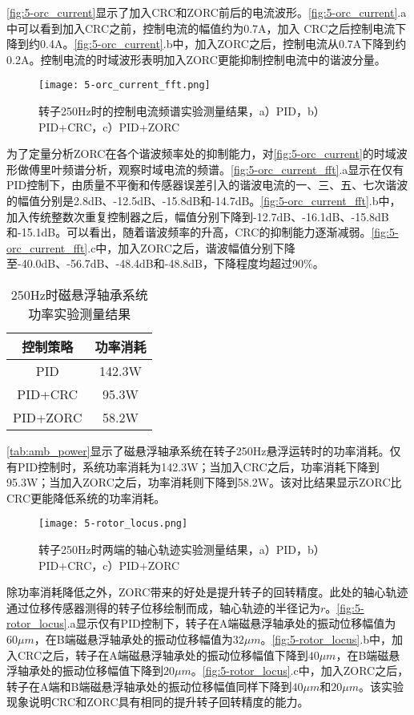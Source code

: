 \documentclass[
  lang=cn,
  degree=master,
  openany,oneside
]{nuaathesis}
\begin{document}
\autoref{fig:5-orc_current}显示了加入CRC和ZORC前后的电流波形。\autoref{fig:5-orc_current}.a中可以看到加入CRC之前，控制电流的幅值约为0.7A，加入
CRC之后控制电流下降到约0.4A。\autoref{fig:5-orc_current}.b中，加入ZORC之后，控制电流从0.7A下降到约0.2A。控制电流的时域波形表明加入ZORC更能抑制控制电流中的谐波分量。

\begin{figure}[h!]
	\texttt{[image: 5-orc\_current\_fft.png]}
	\caption{转子250Hz时的控制电流频谱实验测量结果，a）PID，b）PID+CRC，c）PID+ZORC}
	\label{fig:5-orc_current_fft}
\end{figure}

为了定量分析ZORC在各个谐波频率处的抑制能力，对\autoref{fig:5-orc_current}的时域波形做傅里叶频谱分析，观察时域电流的频谱。\autoref{fig:5-orc_current_fft}.a显示在仅有PID控制下，由质量不平衡和传感器误差引入的谐波电流的一、三、五、七次谐波的幅值分别是2.8dB、-12.5dB、-15.8dB和-14.7dB。\autoref{fig:5-orc_current_fft}.b中，加入传统整数次重复控制器之后，幅值分别下降到-12.7dB、-16.1dB、-15.8dB和-15.1dB。可以看出，随着谐波频率的升高，CRC的抑制能力逐渐减弱。\autoref{fig:5-orc_current_fft}.c中，加入ZORC之后，谐波幅值分别下降至-40.0dB、-56.7dB、-48.4dB和-48.8dB，下降程度均超过90\%。

\begin{table}[htb]
  \caption[250Hz时磁悬浮轴承系统功率实验测量结果]{250Hz时磁悬浮轴承系统功率实验测量结果\label{tab:amb_power}}
  \begin{tabular}{cc}
    \toprule
    控制策略 & 功率消耗 \\
    \midrule
    PID & 142.3W\\
    PID+CRC & 95.3W\\
    PID+ZORC & 58.2W\\
    \bottomrule
  \end{tabular}
\end{table}

\autoref{tab:amb_power}显示了磁悬浮轴承系统在转子250Hz悬浮运转时的功率消耗。仅有PID控制时，系统功率消耗为142.3W；当加入CRC之后，功率消耗下降到95.3W；当加入ZORC之后，功率消耗则下降到58.2W。该对比结果显示ZORC比CRC更能降低系统的功率消耗。

\begin{figure}[h!]
	\texttt{[image: 5-rotor\_locus.png]}
	\caption{转子250Hz时两端的轴心轨迹实验测量结果，a）PID，b）PID+CRC，c）PID+ZORC}
	\label{fig:5-rotor_locus}
\end{figure}

除功率消耗降低之外，ZORC带来的好处是提升转子的回转精度。此处的轴心轨迹通过位移传感器测得的转子位移绘制而成，轴心轨迹的半径记为$r$。\autoref{fig:5-rotor_locus}.a显示仅有PID控制下，转子在A端磁悬浮轴承处的振动位移幅值为$60\mu m$，在B端磁悬浮轴承处的振动位移幅值为$32\mu m$。\autoref{fig:5-rotor_locus}.b中，加入CRC之后，转子在A端磁悬浮轴承处的振动位移幅值下降到$40\mu m$，在B端磁悬浮轴承处的振动位移幅值下降到$20\mu m$。\autoref{fig:5-rotor_locus}.c中，加入ZORC之后，转子在A端和B端磁悬浮轴承处的振动位移幅值同样下降到$40\mu m$和$20\mu m$。该实验现象说明CRC和ZORC具有相同的提升转子回转精度的能力。
\end{document}
